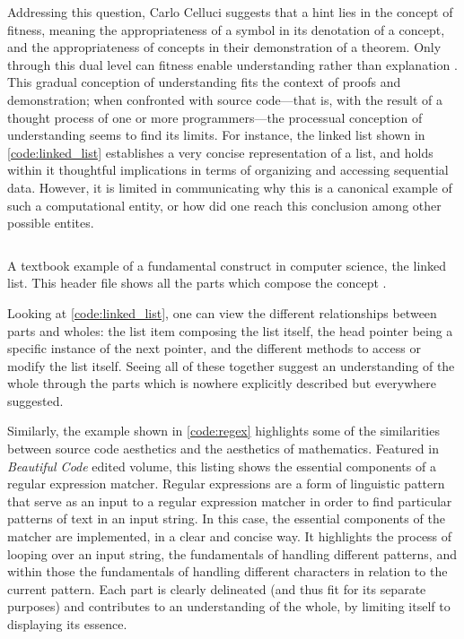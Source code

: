 Addressing this question, Carlo Celluci suggests that a hint lies in the concept of fitness, meaning the appropriateness of a symbol in its denotation of a concept, and the appropriateness of concepts in their demonstration of a theorem. Only through this dual level can fitness enable understanding rather than explanation \citep{cellucci_mathematical_2015}. This gradual conception of understanding fits the context of proofs and demonstration; when confronted with source code—that is, with the result of a thought process of one or more programmers—the processual conception of understanding seems to find its limits. For instance, the linked list shown in \ref{code:linked_list} establishes a very concise representation of a list, and holds within it thoughtful implications in terms of organizing and accessing sequential data. However, it is limited in communicating why this is a canonical example of such a computational entity, or how did one reach this conclusion among other possible entites.

\begin{listing}
    \inputminted{c}{./corpus/linked_list.h}
    \caption{A textbook example of a fundamental construct in computer science, the linked list. This header file shows all the parts which compose the concept \citep{kirchner_content_2022}.}
    \label{code:linked_list}
\end{listing}

Looking at \ref{code:linked_list}, one can view the different relationships between parts and wholes: the list item composing the list itself, the head pointer being a specific instance of the next pointer, and the different methods to access or modify the list itself. Seeing all of these together suggest an understanding of the whole through the parts which is nowhere explicitly described but everywhere suggested.

Similarly, the example shown in \ref{code:regex} highlights some of the similarities between source code aesthetics and the aesthetics of mathematics. Featured in \emph{Beautiful Code} edited volume, this listing shows the essential components of a regular expression matcher. Regular expressions are a form of linguistic pattern that serve as an input to a regular expression matcher in order to find particular patterns of text in an input string. In this case, the essential components of the matcher are implemented, in a clear and concise way. It highlights the process of looping over an input string, the fundamentals of handling different patterns, and within those the fundamentals of handling different characters in relation to the current pattern. Each part is clearly delineated (and thus fit for its separate purposes) and contributes to an understanding of the whole, by limiting itself to displaying its essence.

